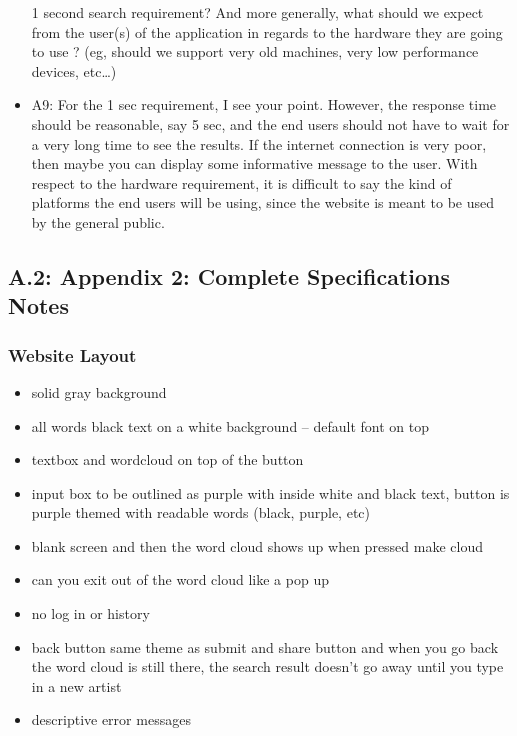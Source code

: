 \documentclass[]{article}
\begin{document}
\begin{itemize}
  1 second search requirement? And more generally, what should we expect
  from the user(s) of the application in regards to the hardware they
  are going to use ? (eg, should we support very old machines, very low
  performance devices, etc\ldots{})
\item
  A9: For the 1 sec requirement, I see your point. However, the response
  time should be reasonable, say 5 sec, and the end users should not
  have to wait for a very long time to see the results. If the internet
  connection is very poor, then maybe you can display some informative
  message to the user. With respect to the hardware requirement, it is
  difficult to say the kind of platforms the end users will be using,
  since the website is meant to be used by the general public.
\end{itemize}

\subsection{A.2: Appendix 2: Complete Specifications
Notes}\label{a.2-appendix-2-complete-specifications-notes}

\subsubsection{Website Layout}\label{website-layout}

\begin{itemize}
\itemsep1pt\parskip0pt
\item
  solid gray background
\item
  all words black text on a white background -- default font on top
\item
  textbox and wordcloud on top of the button
\item
  input box to be outlined as purple with inside white and black text,
  button is purple themed with readable words (black, purple, etc)
\item
  blank screen and then the word cloud shows up when pressed make cloud
\item
  can you exit out of the word cloud like a pop up
\item
  no log in or history
\item
  back button same theme as submit and share button and when you go back
  the word cloud is still there, the search result doesn't go away until
  you type in a new artist
\item
  descriptive error messages
\end{itemize}
\end{document}
